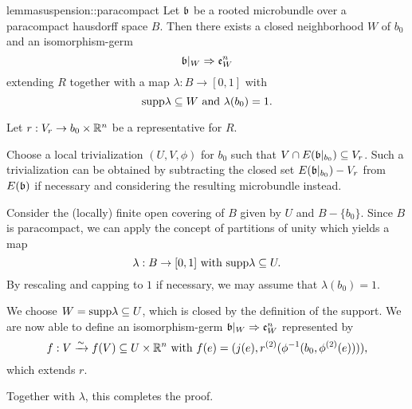 \begin{mystatement}{lemma}{suspension::paracompact}
    Let $\bb$ be a rooted microbundle over a paracompact hausdorff space $B$.
    Then there exists a closed neighborhood $W$ of $b_0$ and an isomorphism-germ
    \[ \germ{\bb[W]}{\be{W}} \]
    extending $R$ together with a map $\lambda: B \to [0, 1]$ with
    \[ \text{supp}{\lambda} \subseteq{} W \text{ and } \lambda(b_0) = 1. \]
\end{mystatement}

\begin{myproof}
    Let $r: V_r \to b_0 \times \mathbb{R}^n$ be a representative for $R$.
    
    Choose a local trivialization $(U, V, \phi)$ for $b_0$ such that $V \cap E(\bbb) \sub V_r$.
    Such a trivialization can be obtained by subtracting the closed set
    $E(\bbb) - V_r$ from $E(\bb)$ if necessary
    and considering the resulting microbundle instead.
    
    Consider the (locally) finite open covering of $B$ given by $U$ and $B - \{b_0\}$.
    Since $B$ is paracompact, we can apply the concept
    of partitions of unity which yields a map
    \[ \lambda: B \to [0, 1] \text{ with } \text{supp}{\lambda} \subseteq{} U. \]
    By rescaling and capping to $1$ if necessary,
    we may assume that $\lambda(b_0) = 1$.

    We choose $W = \text{supp}{\lambda} \subseteq{} U$,
    which is closed by the definition of the support.
    We are now able to define an isomorphism-germ $\germ{\bb[W]}{\be{W}}$ represented by
    \[ f: V \xrightarrow{\sim} f(V) \subseteq{} U \times \mathbb{R}^n \text{ with } f(e) = (j(e), r^{(2)}(\phi^{-1}(b_0, \phi^{(2)}(e)))), \]
    which extends $r$.

    Together with $\lambda$, this completes the proof.
\end{myproof}